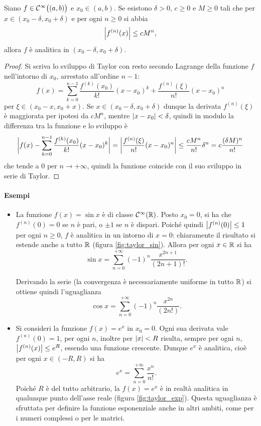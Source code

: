 \begin{teorema}
Siano $f\in\mathcal{C}^{{\infty}}\big((a,b)\big)$ e $x_0\in(a,b)$. Se esistono $\delta>0$, $c\geq 0$ e $M\geq 0$ tali che per $x\in(x_0-\delta,x_0+\delta)$ e per ogni $n\geq 0$ si abbia
\[
\left|{f^{(n)}(x)}\right|\leq cM^n,
\]
allora $f$ è analitica in $(x_0-\delta,x_0+\delta)$.
\end{teorema}
\begin{proof}
Si scriva lo sviluppo di Taylor con resto secondo Lagrange della funzione $f$ nell'intorno di $x_0$, arrestato all'ordine $n-1$:
\[
f(x)=\sum_{k=0}^{n-1}\frac{f^{(k)}(x_0)}{k!}(x-x_0)^k+\frac{f^{(n)}(\xi)}{n!}(x-x_0)^n
\]
per $\xi\in(x_0-x,x_0+x)$. Se $x\in(x_0-\delta,x_0+\delta)$ dunque la derivata $f^{(n)}(\xi)$ è maggiorata per ipotesi da $cM^n$, mentre $\left|{x-x_0}\right|<\delta$, quindi in modulo la differenza tra la funzione e lo sviluppo è
\[
\bigg|f(x)-\sum_{k=0}^{n-1}\frac{f^{(k)}(x_0)}{k!}(x-x_0)^k\bigg|=\left|{\frac{f^{(n)}(\xi)}{n!}(x-x_0)^n}\right|\leq\frac{cM^n}{n!}\delta^n=c\frac{(\delta M)^n}{n!}
\]
che tende a 0 per $n\to+\infty$, quindi la funzione coincide con il suo sviluppo in serie di Taylor.
\end{proof}
\paragraph{Esempi}
\begin{itemize}
\item La funzione $f(x)=\sin x$ è di classe $\mathcal{C}^{{\infty}}(\mathbb{R})$. Posto $x_0=0$, si ha che $f^{(n)}(0)=0$ se $n$ è pari, o $\pm 1$ se $n$ è dispari. Poiché quindi $\left|{f^{(n)}(0)}\right|\leq 1$ per ogni $n\geq 0$, $f$ è analitica in un intorno di $x=0$: chiaramente il risultato si estende anche a tutto $\mathbb{R}$ (figura \ref{fig:taylor_sin}).
Allora per ogni $x\in\mathbb{R}$ si ha
\[
\sin x=\sum_{n=0}^{+\infty}(-1)^n\frac{x^{2n+1}}{(2n+1)!}.
\]

Derivando la serie (la convergenza è necessariamente uniforme in tutto $\mathbb{R}$) si ottiene quindi l'uguaglianza
\[
\cos x=\sum_{n=0}^{+\infty}(-1)^n\frac{x^{2n}}{(2n!)}.
\]
\item Si consideri la funzione $f(x)=e^x$ in $x_0=0$. Ogni sua derivata vale $f^{(n)}(0)=1$, per ogni $n$, inoltre per $\left|{x}\right|<R$ risulta, sempre per ogni $n$, $\left|{f^{(n)}(x)}\right|\leq e^R$, essendo una funzione crescente. Dunque $e^x$ è analitica, cioè per ogni $x\in(-R,R)$ si ha
\[
e^x=\sum_{n=0}^{+\infty}\frac{x^n}{n!}.
\]
Poiché $R$ è del tutto arbitrario, la $f(x)=e^x$ è in realtà analitica in qualunque punto dell'asse reale (figura \ref{fig:taylor_exp}).
Questa uguaglianza è sfruttata per definire la funzione esponenziale anche in altri ambiti, come per i numeri complessi o per le matrici.
\end{itemize}

